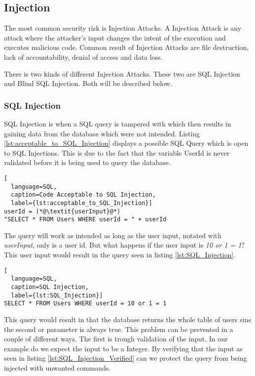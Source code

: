 \subsection{Injection}
The most common security risk is Injection Attacks. \parencite{OWASP2017} A Injection Attack is any attack where the attacker's input changes the intent of the execution and executes malicious code. Common result of Injection Attacks are file destruction, lack of accountability, denial of access and data loss. \parencite{Secure_Web}

There is two kinds of different Injection Attacks. These two are SQL Injection and Blind SQL Injection. \parencite{Secure_Web} Both will be described below.


\subsubsection{SQL Injection}
SQL Injection is when a SQL query is tampered with which then results in gaining data from the database which were not intended. Listing \ref{lst:acceptable_to_SQL_Injection} displays a possible SQL Query which is open to SQL Injections. This is due to the fact that the variable UserId is never validated before it is being used to query the database. \parencite{JustinClarke-Salt2009SIAa, Secure_Web} 

\hfill
\begin{lstlisting}[
  language=SQL,
  caption=Code Acceptable to SQL Injection,
  label={lst:acceptable_to_SQL_Injection}]
userId = (*@\textit{userInput}@*)
"SELECT * FROM Users WHERE userId = " + userId
\end{lstlisting}
\hfill

The query will work as intended as long as the user input, notated with \textit{userInput}, only is a user id. But what happens if the user input is \textit{10 or 1 = 1}? This user input would result in the query seen in listing \ref{lst:SQL_Injection}.

\hfill
\begin{lstlisting}[
  language=SQL,
  caption=SQL Injection,
  label={lst:SQL_Injection}]
SELECT * FROM Users WHERE userId = 10 or 1 = 1
\end{lstlisting}
\hfill

This query would result in that the database returns the whole table of users sins the second or parameter is always true. This problem can be prevented in a couple of different ways. The first is trough validation of the input. In our example do we expect the input to be a Integer. By verifying that the input as seen in listing \ref{lst:SQL_Injection_Verified} can we protect the query from being injected with unwanted commands.

